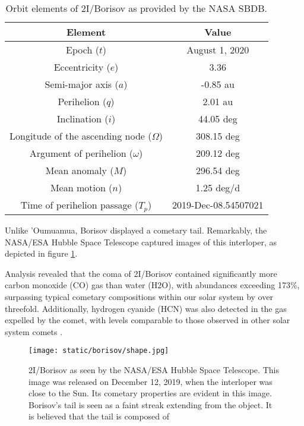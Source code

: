\begin{table}[H]
  \centering
  \begin{tabular}{|c|c|}
    \hline
    Element                                    & Value                \\
    \hline
    Epoch ($t$)                                & August 1, 2020       \\
    Eccentricity ($e$)                         & 3.36                 \\
    Semi-major axis ($a$)                      & -0.85 au             \\
    Perihelion ($q$)                           & 2.01 au              \\
    Inclination ($i$)                          & 44.05 deg            \\
    Longitude of the ascending node ($\Omega$) & 308.15 deg           \\
    Argument of perihelion ($\omega$)          & 209.12 deg           \\
    Mean anomaly ($M$)                         & 296.54 deg           \\
    Mean motion ($n$)                          & 1.25 deg/d           \\
    Time of perihelion passage ($T_p$)         & 2019-Dec-08.54507021 \\
    \hline
  \end{tabular}
  \caption{Orbit elements of 2I/Borisov as provided by the NASA SBDB.}
  \label{tab:borisov_elements}
\end{table}

Unlike 'Oumuamua, Borisov displayed a cometary tail. Remarkably, the NASA/ESA
Hubble Space Telescope captured images of this interloper, as depicted in figure
\ref{fig:borisov_shape}.

Analysis revealed that the coma of 2I/Borisov contained significantly more
carbon monoxide (CO) gas than water (H2O), with abundances exceeding 173\%,
surpassing typical cometary compositions within our solar system by over
threefold. Additionally, hydrogen cyanide (HCN) was also detected in the gas
expelled by the comet, with levels comparable to those observed in other solar
system comets \cite{bodewits2020}.

\begin{figure}[H]
  \centering
  \texttt{[image: static/borisov/shape.jpg]}
  \caption[Borisov as seen by the NASA/ESA Hubble Space Telescope]{
    2I/Borisov as seen by the NASA/ESA Hubble Space Telescope. This image was
    released on December 12, 2019, when the interloper was close to the Sun. Its
    cometary properties are evident in this image. Borisov's tail is seen as a
    faint streak extending from the object. It is believed that the tail is composed
    of
  }
  \label{fig:borisov_shape}
\end{figure}

